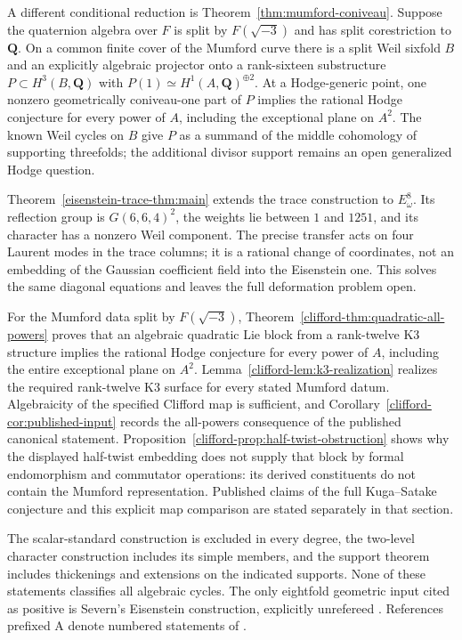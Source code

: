 \documentclass[11pt]{article}
\theoremstyle{definition}
\theoremstyle{remark}
\newcommand{\Q}{\mathbf Q}
\begin{document}
A different conditional reduction is Theorem~\ref{thm:mumford-coniveau}. Suppose the quaternion algebra over $F$ is split by $F(\sqrt{-3})$ and has split corestriction to $\Q$. On a common finite cover of the Mumford curve there is a split Weil sixfold $B$ and an explicitly algebraic projector onto a rank-sixteen substructure $P\subset H^3(B,\Q)$ with $P(1)\simeq H^1(A,\Q)^{\oplus2}$. At a Hodge-generic point, one nonzero geometrically coniveau-one part of $P$ implies the rational Hodge conjecture for every power of $A$, including the exceptional plane on $A^2$. The known Weil cycles on $B$ give $P$ as a summand of the middle cohomology of supporting threefolds; the additional divisor support remains an open generalized Hodge question.


Theorem~\ref{eisenstein-trace-thm:main} extends the trace construction
to $E_\omega^8$. Its reflection group is
$G(6,6,4)^2$, the weights lie between $1$ and $1251$, and its
character has a nonzero Weil component. The precise transfer acts on
four Laurent modes in the trace columns; it is a rational change of
coordinates, not an embedding of the Gaussian coefficient field into
the Eisenstein one. This solves the same diagonal equations and
leaves the full deformation problem open.

For the Mumford data split by $F(\sqrt{-3})$,
Theorem~\ref{clifford-thm:quadratic-all-powers} proves that an algebraic
quadratic Lie block from a rank-twelve K3 structure implies the rational
Hodge conjecture for every power of $A$, including the entire
exceptional plane on $A^2$. Lemma~\ref{clifford-lem:k3-realization} realizes the required
rank-twelve K3 surface for every stated Mumford datum. Algebraicity
of the specified Clifford map is sufficient, and
Corollary~\ref{clifford-cor:published-input} records the all-powers
consequence of the published canonical statement. Proposition~\ref{clifford-prop:half-twist-obstruction}
shows why the displayed half-twist embedding does not supply that
block by formal endomorphism and commutator operations: its derived
constituents do not contain the Mumford representation. Published
claims of the full Kuga--Satake conjecture and this explicit map
comparison are stated separately in that section.

The scalar-standard construction is excluded in every degree, the
two-level character construction includes its simple members, and the
support theorem includes thickenings and extensions on the indicated
supports. None of these statements classifies all algebraic cycles.
The only eightfold geometric input cited as positive is Severn's
Eisenstein construction, explicitly unrefereed \cite{Severn}.
References prefixed A denote numbered statements of \cite{CompanionA}.
\end{document}

